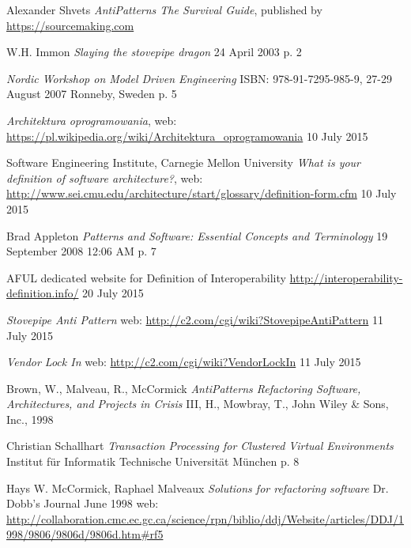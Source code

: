 \begin{thebibliography}{9}
     
    Alexander Shvets
    \emph{AntiPatterns The Survival Guide},
    published by \url{https://sourcemaking.com}
    
    W.H. Immon
    \emph{Slaying the stovepipe dragon}
    24 April 2003
    p. 2
    
    \emph{Nordic Workshop on Model Driven Engineering}
    ISBN: 978-91-7295-985-9,
    27-29 August 2007 Ronneby, Sweden
    p. 5
    
    \emph{Architektura oprogramowania},
    web: \url{https://pl.wikipedia.org/wiki/Architektura_oprogramowania}
    10 July 2015
    
    Software Engineering Institute, Carnegie Mellon University
    \emph{What is your definition of software architecture?},
    web: \url{http://www.sei.cmu.edu/architecture/start/glossary/definition-form.cfm}
    10 July 2015
    
     Brad Appleton
     \emph{Patterns and Software: Essential Concepts and Terminology}
     19 September 2008 12:06 AM
     p. 7
     
    AFUL dedicated website for Definition of Interoperability
    \url{http://interoperability-definition.info/}
    20 July 2015
     
    \emph{Stovepipe Anti Pattern}
    web: \url{http://c2.com/cgi/wiki?StovepipeAntiPattern}
    11 July 2015
    
    \emph{Vendor Lock In}
    web: \url{http://c2.com/cgi/wiki?VendorLockIn}
    11 July 2015
    
    Brown, W., Malveau, R., McCormick
    \emph{AntiPatterns Refactoring Software, Architectures, and Projects in Crisis}
    III, H., Mowbray, T., John Wiley \& Sons, Inc., 1998
    
    Christian Schallhart
    \emph{Transaction Processing for Clustered Virtual Environments}
    Institut für Informatik
    Technische Universität München
    p. 8
    
    Hays W. McCormick, Raphael Malveaux
    \emph{Solutions for refactoring software}
    Dr. Dobb's Journal June 1998
    web: \url{http://collaboration.cmc.ec.gc.ca/science/rpn/biblio/ddj/Website/articles/DDJ/1998/9806/9806d/9806d.htm#rf5}

\end{thebibliography}
